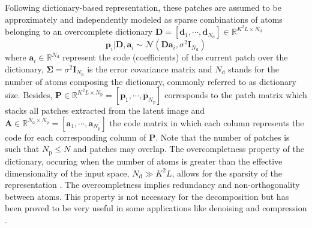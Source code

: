 \documentclass[review]{elsarticle}
\newcommand{\Ndim}{L}
\newcommand{\Psize}{K}
\newcommand{\Natom}{N_{\mathrm{d}}}
\newcommand{\Npatch}{N_{\mathrm{p}}}
\begin{document}
Following dictionary-based representation, these patches are assumed to be approximately and independently modeled as sparse combinations of atoms belonging to an overcomplete dictionary $\mathbf{D}  = \left[\mathbf{d}_{1}, \cdots, \mathbf{d}_{\Natom}\right] \in \mathbb{R}^{\Psize^{2}\Ndim \times \Natom}$
\begin{equation}
\label{eq:patchRepresentation}
	\mathbf{p}_{i}|\mathbf{D},\mathbf{a}_{i} \sim \mathcal{N}\left(\mathbf{D}\mathbf{a}_{i},\sigma^2 \mathbf{I}_{\Natom}\right)
\end{equation}
where $\mathbf{a}_{i} \in \mathbb{R}^{\Natom}$ represent the code (coefficients) of the current patch over the dictionary, $\boldsymbol{\Sigma}=\sigma^2 \mathbf{I}_{\Natom}$ is the error covariance matrix and $\Natom$ stands for the number of atoms composing the dictionary, commonly referred to as dictionary size. Besides, $\mathbf{P} \in \mathbb{R}^{\Psize^{2}\Ndim \times \Npatch} = \left[\mathbf{p}_{1}, \cdots, \mathbf{p}_{\Npatch}\right]$ corresponds to the patch matrix which stacks all patches extracted from the latent image and $\mathbf{A} \in \mathbb{R}^{\Natom \times \Npatch} = \left[\mathbf{a}_{1}, \cdots, \mathbf{a}_{\Npatch}\right]$ the code matrix in which each column represents the code for each corresponding column of $\mathbf{P}$. Note that the number of patches is such that $\Npatch \leq N$ and patches may overlap. The overcompletness property of the dictionary, occuring when the number of atoms is greater than the effective dimensionality of the input space, $\Natom \gg \Psize^{2} \Ndim $, allows for the sparsity of the representation \citep{olshausen_sparse_1997}. The overcompletness implies redundancy and non-orthogonality between atoms. This property is not necessary for the decomposition but has been proved to be very useful in some applications like denoising and compression \citep{aharon_k-svd_2006}.
\end{document}
